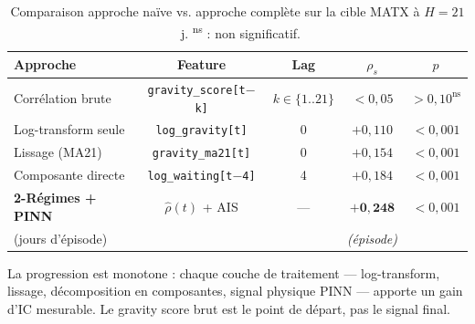 \begin{table}[ht]
\centering
\caption{Comparaison approche naïve vs. approche complète sur la cible MATX
à $H = 21$~j. \textsuperscript{ns} : non significatif.}
\label{tab:approach_comparison}
\small
\begin{tabular}{p{4cm}cccc}
\toprule
\textbf{Approche} & \textbf{Feature} & \textbf{Lag} & $\rho_s$ & $p$ \\
\midrule
Corrélation brute &
\texttt{gravity\_score[t$-$k]} & $k \in \{1..21\}$ & $<0{,}05$ &
$>0{,}10^{\text{ns}}$ \\
\addlinespace
Log-transform seule &
\texttt{log\_gravity[t]} & 0 & $+0{,}110$ & $<0{,}001$ \\
\addlinespace
Lissage (MA21) &
\texttt{gravity\_ma21[t]} & 0 & $+0{,}154$ & $<0{,}001$ \\
\addlinespace
Composante directe &
\texttt{log\_waiting[t$-$4]} & 4 & $+0{,}184$ & $<0{,}001$ \\
\addlinespace
\textbf{2-Régimes + PINN} &
$\hat{\rho}(t)$ + AIS & --- &
$\mathbf{+0{,}248}$ & $<0{,}001$ \\
\quad(jours d'épisode) & & & \textit{(épisode)} & \\
\bottomrule
\end{tabular}
\end{table}

\noindent
La progression est monotone : chaque couche de traitement --- log-transform,
lissage, décomposition en composantes, signal physique PINN --- apporte un
gain d'IC mesurable. Le gravity score brut est le point de départ, pas le
signal final.
